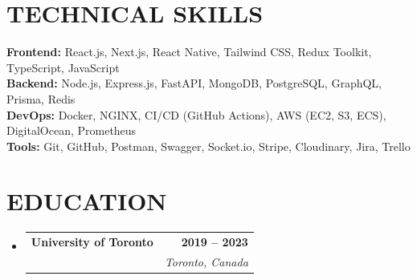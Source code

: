 \documentclass[letterpaper,11pt]{article}
\makeatletter
\newcommand{\resumeSubheading}[4]{
  \vspace{-2pt}\item
  \begin{tabular*}{1.0\textwidth}[t]{l@{\extracolsep{\fill}}r}
  \textbf{#1} & \textbf{\small #2} \\
  \textit{\small#3} & \textit{\small #4} \\
  \end{tabular*}\vspace{-7pt}
}
\newcommand{\resumeSubHeadingListStart}{\begin{itemize}[leftmargin=0.0in, label={}]}
\newcommand{\resumeSubHeadingListEnd}{\end{itemize}}
\makeatother
\begin{document}
\section{TECHNICAL SKILLS}
  \begin{itemize}[leftmargin=0.15in, label={}]
    \small{\item{
      \textbf{Frontend:} React.js, Next.js, React Native, Tailwind CSS, Redux Toolkit, TypeScript, JavaScript \\ \vspace{0.4em}
      \textbf{Backend:} Node.js, Express.js, FastAPI, MongoDB, PostgreSQL, GraphQL, Prisma, Redis \\ \vspace{0.4em}
      \textbf{DevOps:} Docker, NGINX, CI/CD (GitHub Actions), AWS (EC2, S3, ECS), DigitalOcean, Prometheus \\ \vspace{0.4em}
      \textbf{Tools:} Git, GitHub, Postman, Swagger, Socket.io, Stripe, Cloudinary, Jira, Trello
    }}
  \end{itemize}


\section{EDUCATION}
\resumeSubHeadingListStart
\vspace{0.8em}
\resumeSubheading
{University of Toronto}{2019 -- 2023}
{\parbox[t]{0.8\textwidth}{BS Computer Science \\[4pt]\textbf{Relevant Courses:} Web Development, Databases, Cloud Computing, Software Engineering}}{Toronto, Canada}
\resumeSubHeadingListEnd
\end{document}
